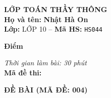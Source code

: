 \noindent
\begin{tcolorbox}[colback=white,colframe=black,arc=0mm,boxrule=0.8pt,top=4pt,bottom=4pt,left=6pt,right=6pt]
	\begin{minipage}[c]{0.44\textwidth}
		{\bfseries\large LỚP TOÁN THẦY THÔNG}\\[3pt]
		\textbf{Họ và tên:} \textbf{\large Nhật Hà On}\\[3pt]
		\textbf{Lớp:} LỚP 10 \quad -- \quad \textbf{Mã HS:} \texttt{HS044}
	\end{minipage}
	\hfill
	\begin{minipage}[c]{0.22\textwidth}
		\begin{tcolorbox}[colback=white,colframe=black,arc=0mm,boxrule=0.6pt,height=1.8cm,halign=center,valign=top,top=2pt]
			{\bfseries\normalsize Điểm}
		\end{tcolorbox}
	\end{minipage}
	\hfill
	\begin{minipage}[c]{0.30\textwidth}
		\raggedleft
		\textit{Thời gian làm bài: 30 phút}\\[4pt]
		\textbf{Mã đề thi:} 
	\end{minipage}
\end{tcolorbox}
\vspace{0.25cm}

\noindent\textbf{\large ĐỀ BÀI (MÃ ĐỀ: 004)}
\vspace{0.1cm}

